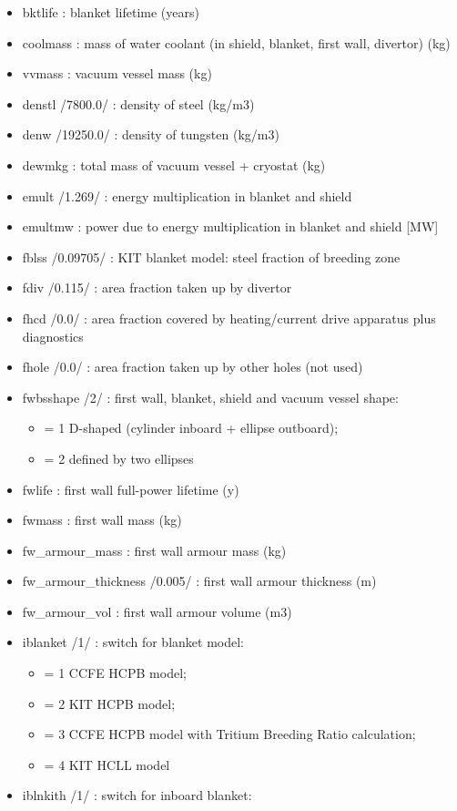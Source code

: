 \documentclass[]{article}
\begin{document}
\begin{itemize}
\item
  bktlife : blanket lifetime (years)
\item
  coolmass : mass of water coolant (in shield, blanket, first wall,
  divertor) (kg)
\item
  vvmass : vacuum vessel mass (kg)
\item
  denstl /7800.0/ : density of steel (kg/m3)
\item
  denw /19250.0/ : density of tungsten (kg/m3)
\item
  dewmkg : total mass of vacuum vessel + cryostat (kg)
\item
  emult /1.269/ : energy multiplication in blanket and shield
\item
  emultmw : power due to energy multiplication in blanket and shield
  {[}MW{]}
\item
  fblss /0.09705/ : KIT blanket model: steel fraction of breeding zone
\item
  fdiv /0.115/ : area fraction taken up by divertor
\item
  fhcd /0.0/ : area fraction covered by heating/current drive apparatus
  plus diagnostics
\item
  fhole /0.0/ : area fraction taken up by other holes (not used)
\item
  fwbsshape /2/ : first wall, blanket, shield and vacuum vessel shape:

  \begin{itemize}
  \itemsep1pt\parskip0pt
  \item
    = 1 D-shaped (cylinder inboard + ellipse outboard);
  \item
    = 2 defined by two ellipses
  \end{itemize}
\item
  fwlife : first wall full-power lifetime (y)
\item
  fwmass : first wall mass (kg)
\item
  fw\_armour\_mass : first wall armour mass (kg)
\item
  fw\_armour\_thickness /0.005/ : first wall armour thickness (m)
\item
  fw\_armour\_vol : first wall armour volume (m3)
\item
  iblanket /1/ : switch for blanket model:

  \begin{itemize}
  \itemsep1pt\parskip0pt
  \item
    = 1 CCFE HCPB model;
  \item
    = 2 KIT HCPB model;
  \item
    = 3 CCFE HCPB model with Tritium Breeding Ratio calculation;
  \item
    = 4 KIT HCLL model
  \end{itemize}
\item
  iblnkith /1/ : switch for inboard blanket:


\end{itemize}
\end{document}

